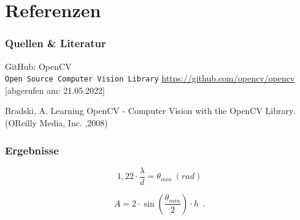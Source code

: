 \documentclass{beamer}
\begin{document}
\section[Quellen]{Referenzen}
\begin{frame}\frametitle{Quellen \& Literatur}

	\begin{thebibliography}{9}
		
		GitHub: OpenCV
		\\\texttt{Open Source Computer Vision Library}
		\url{https://github.com/opencv/opencv}
		[abgerufen am: 21.05.2022]
		
		Bradski, A. Learning OpenCV - Computer Vision with the OpenCV Library. (OReilly Media, Inc. ,2008)
		
		
		
		
		
	\end{thebibliography}

\end{frame}


\begin{frame}
	\frametitle{Ergebnisse}
	

\begin{minipage}{0.45\textwidth}
		\begin{equation}
			1,22\cdot\dfrac{\lambda}{d}=\theta_{min}~(rad)	
		\label{f2}
	\end{equation}
\end{minipage}
\begin{minipage}{0.1\textwidth}
\end{minipage}
\begin{minipage}{0.45\textwidth}
	\begin{equation}
	A=2\cdot\sin\left(\frac{\theta_{min}}{2}\right)\cdot h	~~.
	\label{f3}
	\end{equation}
\end{minipage}
\end{frame}
\end{document}
